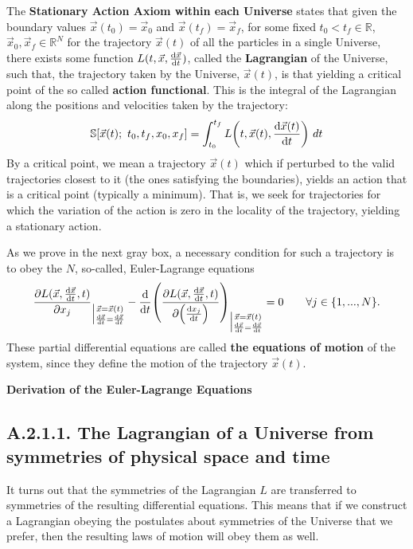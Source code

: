 \documentclass[11pt, a4paper]{article} %
\newcommand{\R}{\mathbb{R}} %
\newcommand{\s}{\mathbb{S}}
\DeclareRobustCommand{\mybox}[2][gray!10]{%
\begin{tcolorbox}[   %
        left=0.2cm,
        right=0.2cm,
        top=0.15cm,
        bottom=0.15cm,
        colback=#1,
        colframe=#1,
        width=\dimexpr\textwidth\relax, 
        enlarge left by=0mm,
        boxsep=5pt,
        arc=0pt,outer arc=0pt,
        ]
        #2
\end{tcolorbox}
}
\begin{document}
The {\bf Stationary Action Axiom within each Universe} states that given the boundary values $\vec{x}(t_0)=\vec{x}_0$ and $\vec{x}(t_f)=\vec{x}_f$, for some fixed $t_0<t_f\in\R$, $\vec{x}_0, \vec{x}_f\in\R^N$ for the trajectory $\vec{x}(t)$ of all the particles in a single Universe, there exists some function $L(t, \vec{x}, \dv{\vec{x}}{t})$, called the {\bf Lagrangian} of the Universe, such that, the trajectory taken by the Universe, $\vec{x}(t)$, is that yielding a critical point of the so called {\bf action functional}. This is the integral of the Lagrangian along the positions and velocities taken by the trajectory:
\begin{equation}\label{action}
\s\qty[\vec{x}(t);\ t_0,t_f,x_0, x_f] = \int_{t_0}^{t_f} L\qty(t, \vec{x}(t),\dv{\vec{x}(t)}{t}(t))\ dt
\end{equation}
By a critical point, we mean a trajectory $\vec{x}(t)$ which if perturbed to the valid trajectories closest to it (the ones satisfying the boundaries), yields an action that is a critical point (typically a minimum). That is, we seek for trajectories for which the variation of the action is zero in the locality of the trajectory, yielding a stationary action.

As we prove in the next gray box, a necessary condition for such a trajectory is to obey the $N$, so-called, Euler-Lagrange equations
\begin{equation}\label{EL}
\pdv{L(\vec{x}, \dv{\vec{x}}{t}, t)}{x_j}_{\Big\rvert {\substack{\vec{x}=\vec{x}(t)\\ \dv{\vec{x}}{t}=\dv{\vec{x}}{t}(t)}}}-\dv{}{t}\qty(\pdv{L(\vec{x}, \dv{\vec{x}}{t}, t)}{\qty(\dv{x_j}{t})})_{\Big\rvert {\substack{\vec{x}=\vec{x}(t)\\ \dv{\vec{x}}{t}=\dv{\vec{x}}{t}(t)}}}=0\quad \quad \forall j\in\{1,...,N\}.
\end{equation}
These partial differential equations are called {\bf the equations of motion} of the system, since they define the motion of the trajectory $\vec{x}(t)$.
\mybox{
{\bf Derivation of the Euler-Lagrange Equations}
}

\subsection*{A.2.1.1. The Lagrangian of a Universe from symmetries of physical space and time}

It turns out that the symmetries of the Lagrangian $L$ are transferred to symmetries of the resulting differential equations. This means that if we construct a Lagrangian obeying the postulates about symmetries of the Universe that we prefer, then the resulting laws of motion will obey them as well.
\end{document}
